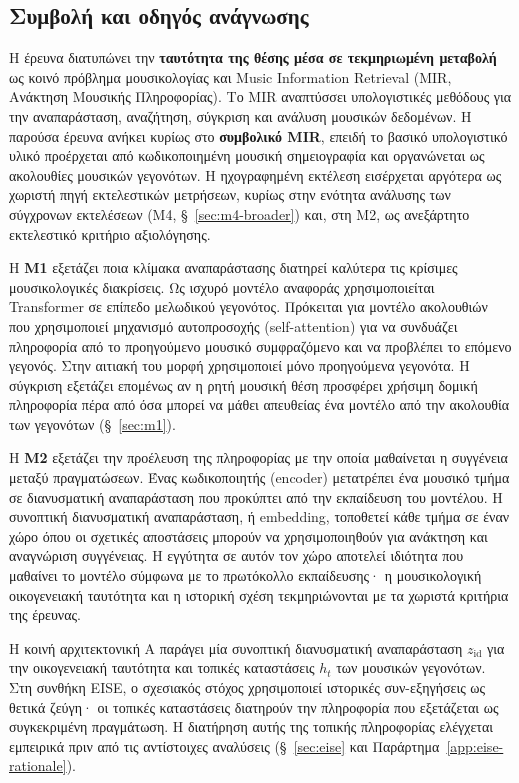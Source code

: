 \documentclass[11pt,a4paper]{article}
\begin{document}
\subsection{Συμβολή και οδηγός ανάγνωσης}

Η έρευνα διατυπώνει την \textbf{ταυτότητα της θέσης μέσα σε τεκμηριωμένη μεταβολή} ως κοινό πρόβλημα μουσικολογίας και Music Information Retrieval (MIR, Ανάκτηση Μουσικής Πληροφορίας). Το MIR αναπτύσσει υπολογιστικές μεθόδους για την αναπαράσταση, αναζήτηση, σύγκριση και ανάλυση μουσικών δεδομένων. Η παρούσα έρευνα ανήκει κυρίως στο \textbf{συμβολικό MIR}, επειδή το βασικό υπολογιστικό υλικό προέρχεται από κωδικοποιημένη μουσική σημειογραφία και οργανώνεται ως ακολουθίες μουσικών γεγονότων. Η ηχογραφημένη εκτέλεση εισέρχεται αργότερα ως χωριστή πηγή εκτελεστικών μετρήσεων, κυρίως στην ενότητα ανάλυσης των σύγχρονων εκτελέσεων (M4, §~\ref{sec:m4-broader}) και, στη M2, ως ανεξάρτητο εκτελεστικό κριτήριο αξιολόγησης.

Η \textbf{M1} εξετάζει ποια κλίμακα αναπαράστασης διατηρεί καλύτερα τις κρίσιμες μουσικολογικές διακρίσεις. Ως ισχυρό μοντέλο αναφοράς χρησιμοποιείται Transformer σε επίπεδο μελωδικού γεγονότος. Πρόκειται για μοντέλο ακολουθιών που χρησιμοποιεί μηχανισμό αυτοπροσοχής (self-attention) για να συνδυάζει πληροφορία από το προηγούμενο μουσικό συμφραζόμενο και να προβλέπει το επόμενο γεγονός. Στην αιτιακή του μορφή χρησιμοποιεί μόνο προηγούμενα γεγονότα. Η σύγκριση εξετάζει επομένως αν η ρητή μουσική θέση προσφέρει χρήσιμη δομική πληροφορία πέρα από όσα μπορεί να μάθει απευθείας ένα μοντέλο από την ακολουθία των γεγονότων (§~\ref{sec:m1}).

Η \textbf{M2} εξετάζει την προέλευση της πληροφορίας με την οποία μαθαίνεται η συγγένεια μεταξύ πραγματώσεων. Ένας κωδικοποιητής (encoder) μετατρέπει ένα μουσικό τμήμα σε διανυσματική αναπαράσταση που προκύπτει από την εκπαίδευση του μοντέλου. Η συνοπτική διανυσματική αναπαράσταση, ή embedding, τοποθετεί κάθε τμήμα σε έναν χώρο όπου οι σχετικές αποστάσεις μπορούν να χρησιμοποιηθούν για ανάκτηση και αναγνώριση συγγένειας. Η εγγύτητα σε αυτόν τον χώρο αποτελεί ιδιότητα που μαθαίνει το μοντέλο σύμφωνα με το πρωτόκολλο εκπαίδευσης· η μουσικολογική οικογενειακή ταυτότητα και η ιστορική σχέση τεκμηριώνονται με τα χωριστά κριτήρια της έρευνας.

Η κοινή αρχιτεκτονική A παράγει μία συνοπτική διανυσματική αναπαράσταση $z_{\mathrm{id}}$ για την οικογενειακή ταυτότητα και τοπικές καταστάσεις $h_t$ των μουσικών γεγονότων. Στη συνθήκη EISE, ο σχεσιακός στόχος χρησιμοποιεί ιστορικές συν-εξηγήσεις ως θετικά ζεύγη· οι τοπικές καταστάσεις διατηρούν την πληροφορία που εξετάζεται ως συγκεκριμένη πραγμάτωση. Η διατήρηση αυτής της τοπικής πληροφορίας ελέγχεται εμπειρικά πριν από τις αντίστοιχες αναλύσεις (§~\ref{sec:eise} και Παράρτημα~\ref{app:eise-rationale}).
\end{document}
